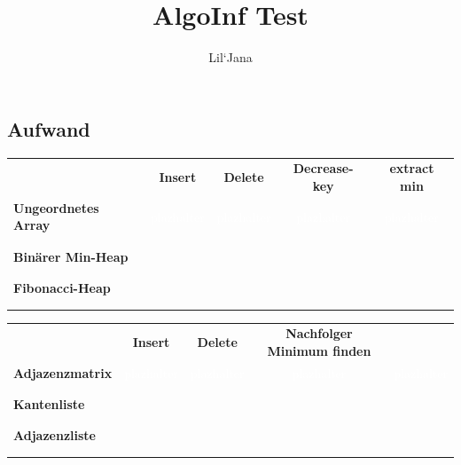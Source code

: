 \documentclass{article}
\title{AlgoInf Test}
\author{Lil`Jana}
\begin{document}
\section{}
\subsection{Aufwand}
\begin{table}[H]
    \begin{tabular}{ p{5cm} | c c c c }
          & \textbf{Insert} & \textbf{Delete} & \textbf{Decrease-key} & \textbf{extract min} \\
        \textbf{Ungeordnetes Array} & \textcolor{white}{plazhalter} & \textcolor{white}{plazhalter} & \textcolor{white}{plazhalter} & \textcolor{white}{plazhalter}  \\ \\ \\
        \textbf{Binärer Min-Heap} & &&&& \\ \\ \\
        \textbf{Fibonacci-Heap} & & && \\ \\ \\
    \end{tabular}
    \label{tab:my_label}
\end{table}

\begin{table}[H]
    \begin{tabular}{ p{5cm} | c c c c}
         & \textbf{Insert} & \textbf{Delete} & \textbf{Nachfolger} \textbf{Minimum finden} \\
         \textbf{Adjazenzmatrix} & \textcolor{white}{plazhalter} &  \textcolor{white}{plazhalter}  & \textcolor{white}{plazhalter} & \textcolor{white}{plazhalter} \\ \\ \\
        \textbf{Kantenliste} & && &  \\ \\ \\
        \textbf{Adjazenzliste} &  & &   & \\ \\ \\
    \end{tabular}
    \label{tab:my_label}
\end{table}
\end{document}
